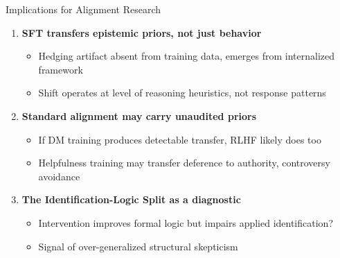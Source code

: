 \documentclass[aspectratio=169,12pt]{beamer}
\begin{document}
\begin{frame}{Implications for Alignment Research}
  \begin{enumerate}
    \item \textbf{SFT transfers epistemic priors, not just behavior}
    \begin{itemize}
      \item Hedging artifact absent from training data, emerges from internalized framework
      \item Shift operates at level of reasoning heuristics, not response patterns
    \end{itemize}

    \item \textbf{Standard alignment may carry unaudited priors}
    \begin{itemize}
      \item If DM training produces detectable transfer, RLHF likely does too
      \item Helpfulness training may transfer deference to authority, controversy avoidance
    \end{itemize}

    \item \textbf{The Identification-Logic Split as a diagnostic}
    \begin{itemize}
      \item Intervention improves formal logic but impairs applied identification?
      \item Signal of over-generalized structural skepticism
    \end{itemize}
  \end{enumerate}

\end{frame}
\end{document}
